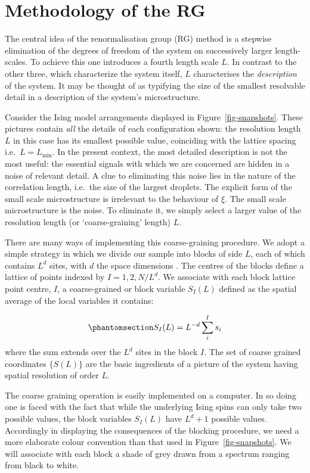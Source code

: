 \documentclass[
  letterpaper,
  enabledeprecatedfontcommands]{report}
\begin{document}
\section{Methodology of the RG}\label{sec-rgmethod}

The central idea of the renormalisation group (RG) method is a stepwise
elimination of the degrees of freedom of the system on successively
larger length-scales. To achieve this one introduces a fourth length
scale \(L\). In contrast to the other three, which characterize the
system itself, \(L\) characterises the \emph{description} of the system.
It may be thought of as typifying the size of the smallest resolvable
detail in a description of the system's microstructure.

Consider the Ising model arrangements displayed in
Figure~\ref{fig-snapshots}. These pictures contain \emph{all} the
details of each configuration shown: the resolution length \(L\) in this
case has its smallest possible value, coinciding with the lattice
spacing i.e.~\(L=L_{\min}\). In the present context, the most detailed
description is not the most useful: the essential signals with which we
are concerned are hidden in a noise of relevant detail. A clue to
eliminating this noise lies in the nature of the correlation length,
i.e.~the size of the largest droplets. The explicit form of the small
scale microstructure is irrelevant to the behaviour of \(\xi\). The
small scale microstructure is the noise. To eliminate it, we simply
select a larger value of the resolution length (or `coarse-graining'
length) \(L\).

There are many ways of implementing this coarse-graining procedure. We
adopt a simple strategy in which we divide our sample into blocks of
side \(L\), each of which contains \(L^d\) sites, with \(d\) the space
dimensions . The centres of the blocks define a lattice of points
indexed by \(I=1,2,N/L^d\). We associate with each block lattice point
centre, \(I\), a coarse-grained or block variable \(S_I(L)\) defined as
the spatial average of the local variables it contains:

\begin{equation}\phantomsection\label{eq-blkvar}{
S_I(L)=L^{-d}\sum_i^Is_i
}\end{equation} where the sum extends over the \(L^d\) sites in the
block \(I\). The set of coarse grained coordinates \(\{S(L)\}\) are the
basic ingredients of a picture of the system having spatial resolution
of order \(L\).

The coarse graining operation is easily implemented on a computer. In so
doing one is faced with the fact that while the underlying Ising spins
can only take two possible values, the block variables \(S_I(L)\) have
\(L^d+1\) possible values. Accordingly in displaying the consequences of
the blocking procedure, we need a more elaborate colour convention than
that used in Figure~\ref{fig-snapshots}. We will associate with each
block a shade of grey drawn from a spectrum ranging from black to white.
\end{document}

